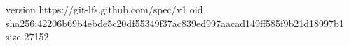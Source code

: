 version https://git-lfs.github.com/spec/v1
oid sha256:42206b69b4ebde5c20df55349f37ac839ed997aacad149ff585f9b21d18997b1
size 27152
